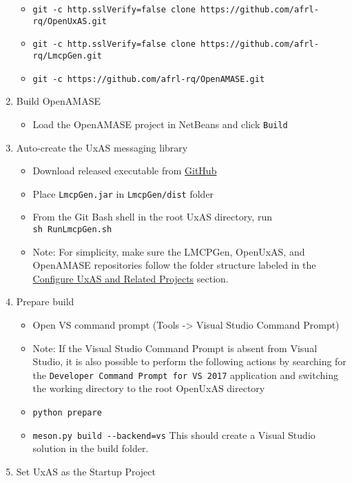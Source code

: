 \begin{enumerate}
  \begin{itemize}
  \item
    \texttt{git\ -c\ http.sslVerify=false\ clone\ https://github.com/afrl-rq/OpenUxAS.git}
  \item
    \texttt{git\ -c\ http.sslVerify=false\ clone\ https://github.com/afrl-rq/LmcpGen.git}
  \item
    \texttt{git\ -c\ https://github.com/afrl-rq/OpenAMASE.git}
  \end{itemize}
\item
  Build OpenAMASE

  \begin{itemize}
  \tightlist
  \item
    Load the OpenAMASE project in NetBeans and click \texttt{Build}
  \end{itemize}
\item
  Auto-create the UxAS messaging library

  \begin{itemize}
  \item
    Download released executable from
    \href{https://github.com/afrl-rq/LmcpGen/releases/download/v1.5.0/LmcpGen.jar}{GitHub}
  \item
    Place \texttt{LmcpGen.jar} in \texttt{LmcpGen/dist} folder
  \item
    From the Git Bash shell in the root UxAS directory, run
    \texttt{sh\ RunLmcpGen.sh}
  \item
    Note: For simplicity, make sure the LMCPGen, OpenUxAS, and OpenAMASE
    repositories follow the folder structure labeled in the
    \protect\hyperlink{configure-uxas-and-related-projects}{Configure
    UxAS and Related Projects} section.
  \end{itemize}
\item
  Prepare build

  \begin{itemize}
  \item
    Open VS command prompt (Tools -\textgreater{} Visual Studio Command
    Prompt)
  \item
    Note: If the Visual Studio Command Prompt is absent from Visual
    Studio, it is also possible to perform the following actions by
    searching for the \texttt{Developer\ Command\ Prompt\ for\ VS\ 2017}
    application and switching the working directory to the root OpenUxAS
    directory
  \item
    \texttt{python\ prepare}
  \item
    \texttt{meson.py\ build\ -\/-backend=vs} This should create a Visual
    Studio solution in the build folder.
  \end{itemize}
\item
  Set UxAS as the Startup Project


\end{enumerate}
